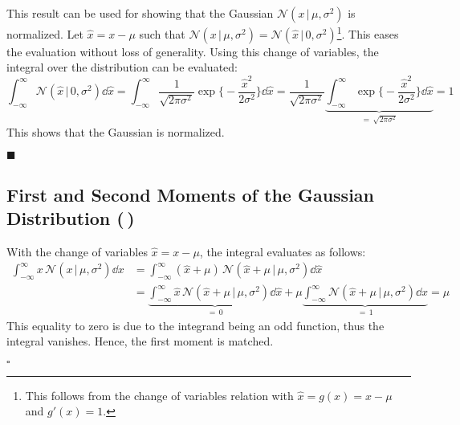 \documentclass[11pt, a4paper]{scrartcl}
\newcommand{\normal}{\mathcal{N}}
\newcommand{\given}{\,\vert\,}
\newcommand{\qed}{\hfill\(\square\)}
\newcommand{\eot}{\hfill\(\blacksquare\)}
\newcommand{\diffstar}{\texorpdfstring{\raisebox{-1pt}{\resizebox{!}{8pt}{\(\star\)}}}{*}}
\newcommand{\twostar}  {(\diffstar\,\diffstar)}
\begin{document}
			This result can be used for showing that the Gaussian \( \normal(x \given \mu, \sigma^2) \) is normalized. Let \( \hat{x} = x - \mu \) such that \( \normal(x \given \mu, \sigma^2) = \normal(\hat{x} \given 0, \sigma^2) \)\footnote{This follows from the change of variables relation with \( \hat{x} = g(x) = x - \mu \) and \( g'(x) = 1 \).}. This eases the evaluation without loss of generality. Using this change of variables, the integral over the distribution can be evaluated:
			\begin{equation}
				\int_{-\infty}^{\infty}\! \normal(\hat{x} \given 0, \sigma^2) \dd{\hat{x}}
					= \int_{-\infty}^{\infty}\! \frac{1}{\sqrt{2 \pi \sigma^2}} \exp\bigg\{\! -\frac{\hat{x}^2}{2 \sigma^2} \bigg\} \dd{\hat{x}}
					= \frac{1}{\sqrt{2 \pi \sigma^2}} \underbrace{\int_{-\infty}^{\infty}\! \exp\bigg\{\! -\frac{\hat{x}^2}{2 \sigma^2} \bigg\} \dd{\hat{x}}}_{=\, \sqrt{2 \pi \sigma^2}} = 1
			\end{equation}
			This shows that the Gaussian is normalized.

			\eot

		\subsection{First and Second Moments of the Gaussian Distribution  \twostar}
			With the change of variables \( \hat{x} = x - \mu \), the integral evaluates as follows:
			\begin{align}
				\int_{-\infty}^{\infty}\! x \, \normal(x \given \mu, \sigma^2) \dd{x}
					&= \int_{-\infty}^{\infty}\! (\hat{x} + \mu) \, \normal(\hat{x} + \mu \given \mu, \sigma^2) \dd{\hat{x}} \\
					&= \underbrace{\int_{-\infty}^{\infty}\! \hat{x} \, \normal(\hat{x} + \mu \given \mu, \sigma^2) \dd{\hat{x}}}_{=\, 0} + \mu \underbrace{\int_{-\infty}^{\infty}\! \normal(\hat{x} + \mu \given \mu, \sigma^2) \dd{\hat{x}}}_{=\, 1}
					 = \mu
			\end{align}
			This equality to zero is due to the integrand being an odd function, thus the integral vanishes. Hence, the first moment is matched.

			\qed
\end{document}
